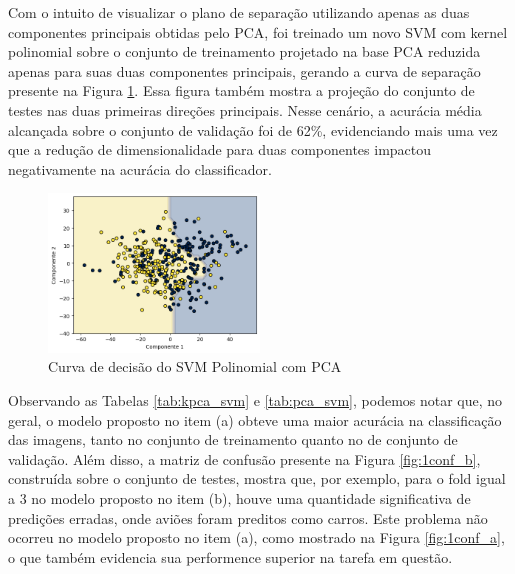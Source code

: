 \documentclass[]{abntex2}
\begin{document}
Com o intuito de visualizar o plano de separação utilizando apenas as duas componentes principais obtidas pelo PCA, foi treinado um novo SVM com kernel polinomial sobre o conjunto de treinamento projetado na base PCA reduzida apenas para suas duas componentes principais, gerando a curva de separação presente na Figura \ref{fig:pca_reta}. Essa figura também mostra a projeção do conjunto de testes nas duas primeiras direções principais. Nesse cenário, a acurácia média alcançada sobre o conjunto de validação foi de 62\%, evidenciando mais uma vez que a redução de dimensionalidade para duas componentes impactou negativamente na acurácia do classificador.

\begin{figure}[H]
    \centering 
    \includegraphics[width=0.5\textwidth]{imgs/ex1/pca_reta.png}
    \caption{Curva de decisão do SVM Polinomial com PCA}
    \label{fig:pca_reta} %
\end{figure}

Observando as Tabelas \ref{tab:kpca_svm} e \ref{tab:pca_svm}, podemos notar que, no geral, o modelo proposto no item (a) obteve uma maior acurácia na classificação das imagens, tanto no conjunto de treinamento quanto no de conjunto de validação. Além disso, a matriz de confusão presente na Figura \ref{fig:1conf_b}, construída sobre o conjunto de testes, mostra que, por exemplo, para o fold igual a 3 no modelo proposto no item (b), houve uma quantidade significativa de predições erradas, onde aviões foram preditos como carros. Este problema não ocorreu no modelo proposto no item (a), como mostrado na Figura \ref{fig:1conf_a}, o que também evidencia sua performence superior na tarefa em questão.
\end{document}
